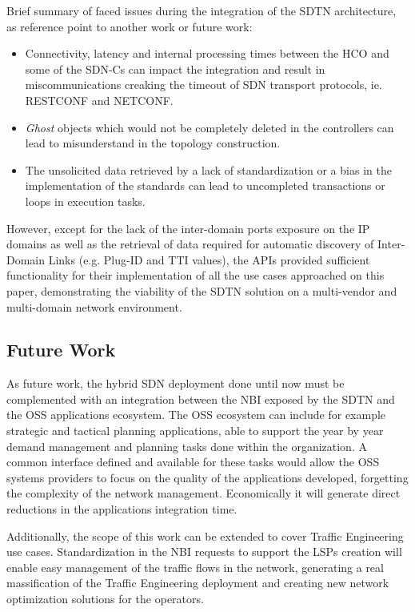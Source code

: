 \documentclass[a4paper,fleqn]{cas-dc}
\begin{document}
Brief summary of faced issues during the integration of the SDTN architecture, as reference point to another work or future work: 

\begin{itemize}
    \item Connectivity, latency and internal processing times between the HCO and some of the SDN-Cs can impact the integration and result in miscommunications creaking the timeout of SDN transport protocols, ie. RESTCONF and NETCONF.  
    \item \textit{Ghost} objects which would not be completely deleted in the controllers can lead to misunderstand in the topology construction. 
    \item The unsolicited data retrieved by a lack of standardization or a bias in the implementation of the standards can lead to uncompleted transactions or loops in execution tasks. 
\end{itemize}
 However, except for the lack of the inter-domain ports exposure on the IP domains as well as the retrieval of data required for automatic discovery of Inter-Domain Links (e.g. Plug-ID and TTI values), the APIs provided sufficient functionality for their implementation of all the use cases approached on this paper, demonstrating the viability of the SDTN solution on a multi-vendor and multi-domain network environment.

\subsection{Future Work}
As future work, the hybrid SDN deployment done until now must be complemented with an integration between the NBI exposed by the SDTN and the OSS applications ecosystem. The OSS ecosystem can include for example strategic and tactical planning applications, able to support the year by year demand management and planning tasks done within the organization. A common interface defined and available for these tasks would allow the OSS systems providers to focus on the quality of the applications developed, forgetting the complexity of the network management. Economically it will generate direct reductions in the applications integration time.

Additionally, the scope of this work can be extended to cover Traffic Engineering use cases. Standardization in the NBI requests to support the LSPs creation will enable easy management of the traffic flows in the network, generating a real massification of the Traffic Engineering deployment and creating new network optimization solutions for the operators.
\end{document}
